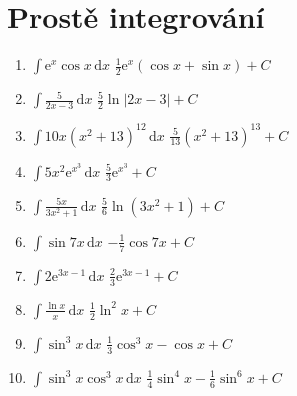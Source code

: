 \documentclass[12pt,a5paper]{article}
\def\ee{\mathrm{e}}
\def\dd{\,\mathrm{d}}
\def\tisk{%
\newbox\shipouthackbox
\pdfpagewidth=2\pdfpagewidth
\let\oldshipout=\shipout
\def\shipout{\afterassignment\zdvojtmp \setbox\shipouthackbox=}%
\def\zdvojtmp{\aftergroup\zdvoj}%
\def\zdvoj{%
 	\oldshipout\vbox{\hbox{%
       	\copy\shipouthackbox
        \hskip\dimexpr .5\pdfpagewidth-\wd\shipouthackbox\relax
        \box\shipouthackbox
    }}%
}}%
\begin{document}

\section*{Prostě integrování}


\def\vysl#1{\hfill#1\par}

\begin{enumerate}
	\everymath{\displaystyle}
	\parskip\medskipamount
	\item $\int \ee^x \cos x \dd x$ \vysl{$\frac12 \ee^x (\cos x + \sin x) + C$}
	\item $\int \frac{5}{2x-3}\dd x$ \vysl{$\frac52\ln|2x-3|+C$}
	\item $\int 10x(x^2 + 13)^{12} \dd x$ \vysl{$\frac{5}{13}(x^2 + 13)^{13} + C$}
	\item $\int 5x^2 \ee^{x^3} \dd x$ \vysl{$\frac53 \ee^{x^3} + C$}
	\item $\int \frac{5x}{3x^2+1} \dd x$ \vysl{$\frac56 \ln(3x^2+1) + C$}
	\item $\int \sin 7x \dd x$ \vysl{$-\frac17 \cos 7x + C$}
	\item $\int 2\ee^{3x-1} \dd x$ \vysl{$\frac23 \ee^{3x-1} + C$}
	\item $\int \frac{\ln x}{x} \dd x$ \vysl{$\frac12 \ln^2 x + C$}
	\item $\int \sin^3 x \dd x$ \vysl{$\frac13 \cos^3 x - \cos x + C$}
	\item $\int \sin^3 x \cos^3 x \dd x$ \vysl{$\frac 14 \sin^4 x - \frac16 \sin^6 x + C$}
\end{enumerate}
\end{document}
